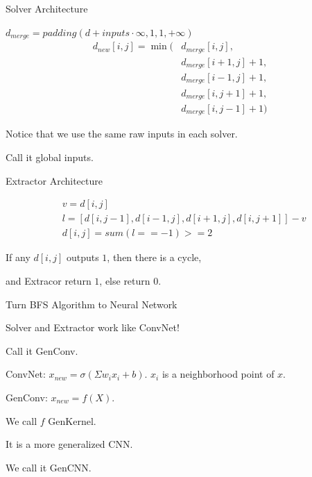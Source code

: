 \documentclass[serif]{beamer}
\begin{document}
\begin{frame}{Solver Architecture}

	$d_{merge} = padding(d + inputs \cdot \infty, 1, 1, +\infty)$
	\begin{align*}
		d_{new}[i,j] = \min( & d_{merge}[i,j],        \\
		                     & d_{merge}[i+1, j] + 1, \\
		                     & d_{merge}[i-1, j] + 1, \\
		                     & d_{merge}[i, j+1] + 1, \\
		                     & d_{merge}[i, j-1] + 1)
	\end{align*}

	Notice that we use the same raw inputs in each solver.

	Call it global inputs.

\end{frame}

\begin{frame}{Extractor Architecture}

	\begin{align*}
		 & v = d[i,j]                                       \\
		 & l = [d[i,j-1], d[i-1,j], d[i+1,j], d[i,j+1]] - v \\
		 & d[i,j] = sum(l == -1) >= 2
	\end{align*}

    \begin{center}

    If any $d[i,j]$ outputs $1$, then there is a cycle, 
    
    and Extracor return $1$, else return $0$.

    \end{center}

\end{frame}


\begin{frame}{Turn BFS Algorithm to Neural Network}

	Solver and Extractor work like ConvNet!

	Call it GenConv.

	ConvNet: $x_{new} = \sigma(\Sigma w_ix_i + b)$. $x_i$ is a neighborhood point of $x$.

	GenConv: $x_{new} = f(X)$.

	We call $f$ GenKernel.

	It is a more generalized CNN.

	We call it GenCNN.

\end{frame}
\end{document}
